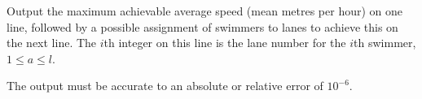 
  Output the maximum achievable average speed (mean metres per hour) on one line,
  followed by a possible assignment of swimmers to lanes to achieve this on the next line.
  The $i$th integer on this line is the lane number for the $i$th swimmer, $1 \le a \le l$.

  The output must be accurate to an absolute or relative error of $10^{-6}$.
